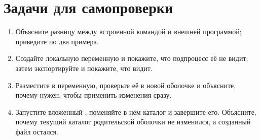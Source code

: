 \section{Задачи для самопроверки}
\begin{enumerate}
  \item Объясните разницу между встроенной командой и внешней
    программой; приведите по два примера.
  \item Создайте локальную переменную и покажите, что подпроцесс
    её не видит; затем экспортируйте и покажите, что видит.
  \item Разместите в  переменную, проверьте её в
    новой оболочке и объясните, почему  нужен,
    чтобы применить изменения сразу.
  \item Запустите вложенный , поменяйте в нём каталог
    и завершите его. Объясните, почему текущий каталог
    родительской оболочки не изменился, а созданный файл остался.
\end{enumerate}
